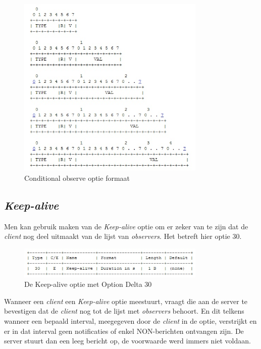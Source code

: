 \begin{figure}[h!]
\centering
\includegraphics[width=0.8\textwidth]{fig/conditional_format}
\caption{Conditional observe optie formaat}
\end{figure}

\subsection{\textit{Keep-alive}}

Men kan gebruik maken van de \textit{Keep-alive} optie om er zeker van te zijn dat de \textit{client} nog deel uitmaakt van de lijst van \textit{observers}. Het betreft hier optie 30.\\

\begin{figure}[h!]
\centering
\includegraphics[width=0.8\textwidth]{fig/keep_alive}
\caption{De Keep-alive optie met Option Delta 30}
\end{figure}

Wanneer een \textit{client} een \textit{Keep-alive} optie meestuurt, vraagt die aan de server te bevestigen dat de \textit{client} nog tot de lijst met \textit{observers} behoort. En dit telkens wanneer een bepaald interval, meegegeven door de \textit{client} in de optie, verstrijkt en er in dat interval geen notificaties of enkel NON-berichten ontvangen zijn. De server stuurt dan een leeg bericht op, de voorwaarde werd immers niet voldaan.


